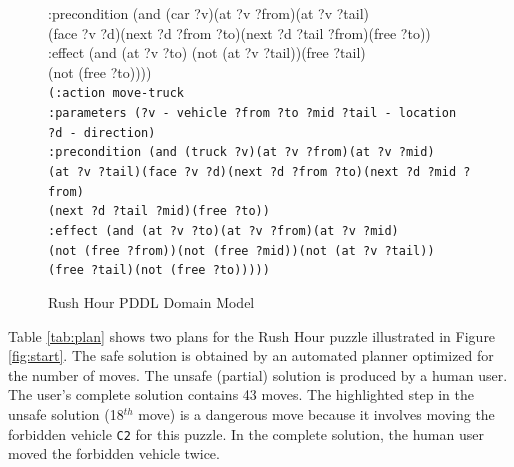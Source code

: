 \documentclass[doctor]{thesis} %
\theoremstyle{plain}
\begin{document}
\begin{figure}[!ht]
{{{{                \hspace*{35pt}:precondition (and (car ?v)(at ?v ?from)(at ?v ?tail)\\\hspace*{35pt}(face ?v ?d)(next ?d ?from ?to)(next ?d ?tail ?from)(free ?to))\\
                \hspace*{35pt}:effect (and (at ?v ?to) (not (at ?v ?tail))(free ?tail)\\\hspace*{35pt}(not (free ?to))))\\[15 pt]}
\texttt{\hspace*{35pt}(:action move-truck \\
                \hspace*{35pt}:parameters (?v - vehicle ?from ?to ?mid ?tail - location \\\hspace*{35pt}?d - direction)\\
                \hspace*{35pt}:precondition (and (truck ?v)(at ?v ?from)(at ?v ?mid)\\\hspace*{35pt}(at ?v ?tail)(face ?v ?d)(next ?d ?from ?to)(next ?d ?mid ?from)\\\hspace*{35pt}(next ?d ?tail ?mid)(free ?to))\\[0.25 pt]
                \hspace*{35pt}:effect (and (at ?v ?to)(at ?v ?from)(at ?v ?mid)\\\hspace*{35pt}(not (free ?from))(not (free ?mid))(not (at ?v ?tail))\\\hspace*{35pt}(free ?tail)(not (free ?to)))))
}
}
}
}
\caption{Rush Hour PDDL Domain Model}
\label{fig:domain}
\end{figure}

Table \ref{tab:plan} shows two plans for the Rush Hour puzzle illustrated in Figure \ref{fig:start}. The safe solution is obtained by an automated planner optimized for the number of moves. The unsafe (partial) solution is produced by a human user. The user's complete solution contains 43 moves. The highlighted step in the unsafe solution (18$^{th}$ move) is a dangerous move because it involves moving the forbidden vehicle \texttt{C2} for this puzzle. In the complete solution, the human user moved the forbidden vehicle twice.
\end{document}
